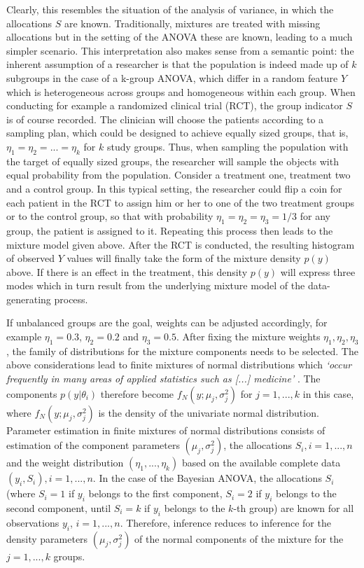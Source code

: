 Clearly, this resembles the situation of the analysis of variance, in which the allocations $S$ are known. Traditionally, mixtures are treated with missing allocations but in the setting of the ANOVA these are known, leading to a much simpler scenario. This interpretation also makes sense from a semantic point: the inherent assumption of a researcher is that the population is indeed made up of $k$ subgroups in the case of a k-group ANOVA, which differ in a random feature $Y$ which is heterogeneous across groups and homogeneous within each group. When conducting for example a randomized clinical trial (RCT), the group indicator $S$ is of course recorded. The clinician will choose the patients according to a sampling plan, which could be designed to achieve equally sized groups, that is, $\eta_1=\eta_2=...=\eta_k$ for $k$ study groups. Thus, when sampling the population with the target of equally sized groups, the researcher will sample the objects with equal probability from the population. Consider a treatment one, treatment two and a control group. In this typical setting, the researcher could flip a coin for each patient in the RCT to assign him or her to one of the two treatment groups or to the control group, so that with probability $\eta_1=\eta_2=\eta_3=1/3$ for any group, the patient is assigned to it. Repeating this process then leads to the mixture model given above. After the RCT is conducted, the resulting histogram of observed $Y$ values will finally take the form of the mixture density $p(y)$ above. If there is an effect in the treatment, this density $p(y)$ will express three modes which in turn result from the underlying mixture model of the data-generating process. 
	
	If unbalanced groups are the goal, weights can be adjusted accordingly, for example $\eta_1=0.3$, $\eta_2=0.2$ and $\eta_3=0.5$. After fixing the mixture weights $\eta_1,\eta_2,\eta_3$, the family of distributions for the mixture components needs to be selected. The above considerations lead to finite mixtures of normal distributions which \textit{`occur frequently in many areas of applied statistics such as [...] medicine'} \citep[p.~169]{Fruhwirth-Schnatter2006}. The components $p(y|\theta_i)$ therefore become $f_N(y;\mu_j,\sigma_j^2)$ for $j=1,...,k$ in this case, where $f_N(y;\mu_j,\sigma_j^2)$ is the density of the univariate normal distribution. Parameter estimation in finite mixtures of normal distributions consists of estimation of the component parameters $(\mu_j,\sigma_j^2)$, the allocations $S_i,i=1,...,n$ and the weight distribution $(\eta_1,...,\eta_k)$ based on the available complete data $(y_i,S_i),i=1,...,n$. In the case of the Bayesian ANOVA, the allocations $S_i$ (where $S_i=1$ if $y_i$ belongs to the first component, $S_i=2$ if $y_i$ belongs to the second component, until $S_i=k$ if $y_i$ belongs to the $k$-th group) are known for all observations $y_i$, $i=1,...,n$. Therefore, inference reduces to inference for the density parameters $(\mu_j,\sigma_j^2)$ of the normal components of the mixture for the $j=1,...,k$ groups.
	
